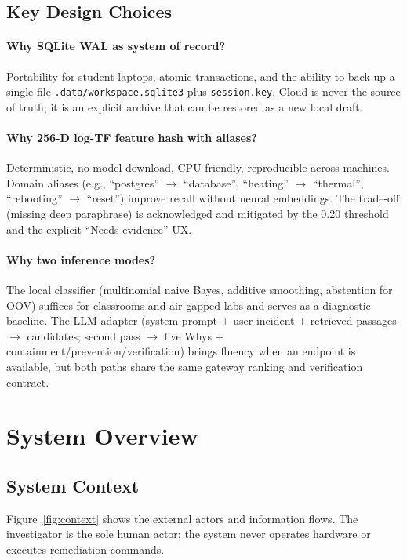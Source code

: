 \documentclass[12pt,a4paper,oneside]{report}
\begin{document}
\subsection*{Key Design Choices}

\paragraph{Why SQLite WAL as system of record?} Portability for student laptops, atomic transactions, and the ability to back up a single file \texttt{.data/workspace.sqlite3} plus \texttt{session.key}. Cloud is never the source of truth; it is an explicit archive that can be restored as a new local draft.

\paragraph{Why 256-D log-TF feature hash with aliases?} Deterministic, no model download, CPU-friendly, reproducible across machines. Domain aliases (e.g., ``postgres'' $\rightarrow$ ``database'', ``heating'' $\rightarrow$ ``thermal'', ``rebooting'' $\rightarrow$ ``reset'') improve recall without neural embeddings. The trade-off (missing deep paraphrase) is acknowledged and mitigated by the 0.20 threshold and the explicit ``Needs evidence'' UX.

\paragraph{Why two inference modes?} The local classifier (multinomial naive Bayes, additive smoothing, abstention for OOV) suffices for classrooms and air-gapped labs and serves as a diagnostic baseline. The LLM adapter (system prompt + user incident + retrieved passages $\rightarrow$ candidates; second pass $\rightarrow$ five Whys + containment/prevention/verification) brings fluency when an endpoint is available, but both paths share the same gateway ranking and verification contract.

\section{System Overview}
\label{sec:overview}

\subsection{System Context}
Figure~\ref{fig:context} shows the external actors and information flows. The investigator is the sole human actor; the system never operates hardware or executes remediation commands.
\end{document}
